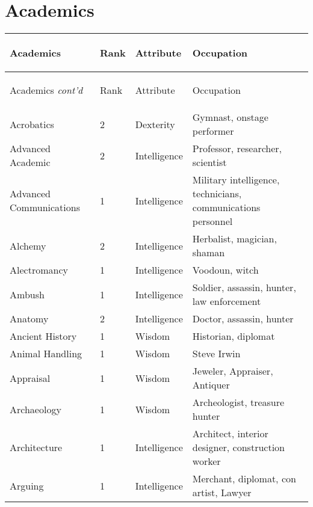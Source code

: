\documentclass[twoside]{book}
\begin{document}
    

\chapter{Academics}
    
\begin{longtable}{p{1.25in}llp{12em}} 
  Academics& \begin{turn}{70}{Rank}\end{turn}
          & \begin{turn}{70}{Attribute}\end{turn}
          & \begin{turn}{70}{Occupation}\end{turn}
          \\
  \hline
  \hline
  \endfirsthead
  Academics \textit{cont'd}
        & \begin{turn}{70}{Rank}\end{turn}
          & \begin{turn}{70}{Attribute}\end{turn}
          & \begin{turn}{70}{Occupation}\end{turn}
           \\
  \hline
  \endhead
\raggedright  Acrobatics& 2& Dexterity& Gymnast, onstage
           performer\tabularnewline
      \raggedright  Advanced Academic& 2& Intelligence& Professor, researcher,
           scientist\tabularnewline
      \raggedright Advanced Communications& 1& Intelligence& Military intelligence,
           technicians, communications personnel\tabularnewline
      \raggedright  Alchemy& 2& Intelligence& Herbalist, magician,
           shaman\tabularnewline
      \raggedright  Alectromancy& 1& Intelligence& Voodoun, witch\tabularnewline
      \raggedright  Ambush& 1& Intelligence& Soldier, assassin,
           hunter, law enforcement\tabularnewline
      \raggedright  Anatomy& 2& Intelligence& Doctor, assassin, hunter\tabularnewline
      \raggedright  Ancient History& 1& Wisdom& Historian, diplomat\tabularnewline
      \raggedright  Animal Handling& 1& Wisdom& Steve Irwin\tabularnewline
      \raggedright  Appraisal& 1& Wisdom& Jeweler, Appraiser,
           Antiquer\tabularnewline
      \raggedright  Archaeology& 1& Wisdom& Archeologist, treasure
           hunter\tabularnewline
      \raggedright  Architecture& 1& Intelligence& Architect, interior
           designer, construction worker\tabularnewline
      \raggedright  Arguing& 1& Intelligence& Merchant, diplomat, con
           artist, Lawyer\tabularnewline

\end{longtable}
\end{document}
